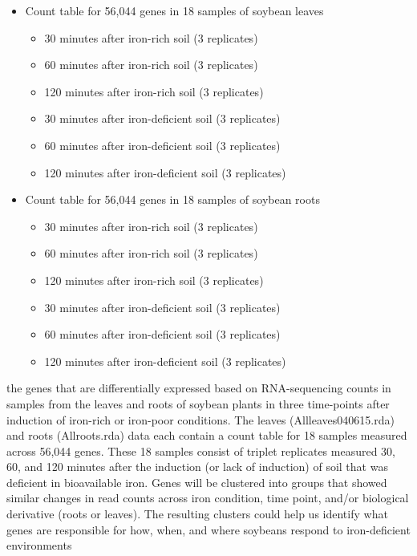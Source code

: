 \documentclass[11pt,a4paper,oldfontcommands,openany]{memoir}
\numberwithin{equation}{section} %
\begin{document}
\begin{itemize}
  \item Count table for 56,044 genes in 18 samples of soybean leaves
  \begin{itemize}
    \item 30 minutes after iron-rich soil (3 replicates)
    \item 60 minutes after iron-rich soil (3 replicates)
    \item 120 minutes after iron-rich soil (3 replicates)
    \item 30 minutes after iron-deficient soil (3 replicates)
    \item 60 minutes after iron-deficient soil (3 replicates)
    \item 120 minutes after iron-deficient soil (3 replicates)
  \end{itemize}
  \item Count table for 56,044 genes in 18 samples of soybean roots
    \begin{itemize}
    \item 30 minutes after iron-rich soil (3 replicates)
    \item 60 minutes after iron-rich soil (3 replicates)
    \item 120 minutes after iron-rich soil (3 replicates)
    \item 30 minutes after iron-deficient soil (3 replicates)
    \item 60 minutes after iron-deficient soil (3 replicates)
    \item 120 minutes after iron-deficient soil (3 replicates)
  \end{itemize}
\end{itemize}

the genes that are differentially expressed based on RNA-sequencing counts in samples from the leaves and roots of soybean plants in three time-points after induction of iron-rich or iron-poor conditions. The leaves (Allleaves040615.rda) and roots (Allroots.rda) data each contain a count table for 18 samples measured across 56,044 genes. These 18 samples consist of triplet replicates measured 30, 60, and 120 minutes after the induction (or lack of induction) of soil that was deficient in bioavailable iron. Genes will be clustered into groups that showed similar changes in read counts across iron condition, time point, and/or biological derivative (roots or leaves). The resulting clusters could help us identify what genes are responsible for how, when, and where soybeans respond to iron-deficient environments
\end{document}
